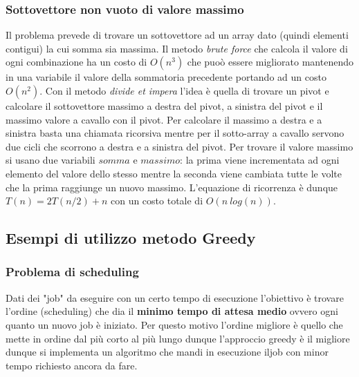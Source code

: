 \documentclass{article}
\begin{document}
\subsubsection{Sottovettore non vuoto di valore massimo}
Il problema prevede di trovare un sottovettore ad un array dato (quindi elementi contigui) la cui somma sia massima. 
Il metodo \textit{brute force} che calcola il valore di ogni combinazione ha un costo di $O(n^3)$ che puoò essere migliorato mantenendo in una variabile il valore della sommatoria precedente  portando ad un costo $O(n^2)$. 
Con il metodo \textit{divide et impera} l'idea è quella di trovare un pivot e calcolare il sottovettore massimo a destra del pivot, a sinistra del pivot e il massimo valore a cavallo con il pivot.
Per calcolare il massimo a destra e a sinistra basta una chiamata ricorsiva mentre per il sotto-array a cavallo servono due cicli che scorrono a destra e a sinistra del pivot. 
Per trovare il valore massimo si usano due variabili $somma$ e $massimo$: la prima viene incrementata ad ogni elemento del valore dello stesso mentre la seconda viene cambiata tutte le volte che la prima raggiunge un nuovo massimo. 
L'equazione di ricorrenza è dunque $T(n) = 2T(n/2)+n$ con un costo totale di $O(n\ log(n))$.

\subsection{Esempi di utilizzo metodo Greedy}
\subsubsection{Problema di scheduling}
Dati dei "job" da eseguire con un certo tempo di esecuzione l'obiettivo è trovare l'ordine (scheduling) che dia il \textbf{minimo tempo di attesa medio} ovvero ogni quanto un nuovo job è iniziato. 
Per questo motivo l'ordine migliore è quello che mette in ordine dal più corto al più lungo dunque l'approccio greedy è il migliore dunque si implementa un algoritmo che mandi in esecuzione iljob con minor tempo richiesto ancora da fare.
\end{document}
